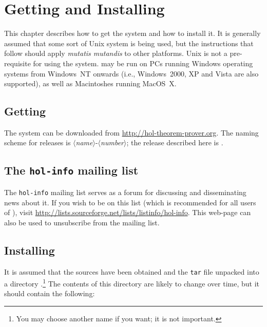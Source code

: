 \chapter{Getting and Installing \HOL{}}
\label{install}

This chapter describes how to get the \HOL{} system and how to install
it.  It is generally assumed that some sort of Unix system is being
used, but the instructions that follow should apply {\it mutatis
  mutandis\/} to other platforms.  Unix is not a pre-requisite for
using the system. \HOL{} may be run on PCs running Windows operating
systems from Windows~NT onwards (i.e., Windows~2000, XP and Vista are
also supported), as well as Macintoshes running MacOS~X.

\section{Getting \HOL{}}

The \HOL{} system can be downloaded from \url{http://hol-theorem-prover.org}.
The naming scheme for \holn{} releases is $\langle${\it name}$\rangle$-$\langle${\it number}$\rangle$; the release described here is \holnversion.

\section{The {\tt hol-info} mailing list}

The \texttt{hol-info} mailing list serves as a forum for discussing
\HOL{} and disseminating news about it.  If you wish to be on this
list (which is recommended for all users of \HOL), visit
\url{http://lists.sourceforge.net/lists/listinfo/hol-info}.  This
web-page can also be used to unsubscribe from the mailing list.

\section{Installing \HOL{}}

It is assumed that the \HOL{} sources have been obtained and the
\texttt{tar} file unpacked into a directory .\footnote{You may
  choose another name if you want; it is not important.} The contents
of this directory are likely to change over time, but it should
contain the following:

